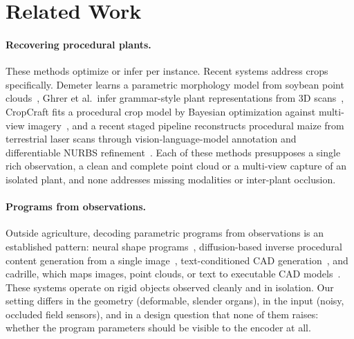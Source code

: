 \section{Related Work}
\label{sec:related}

\paragraph{Recovering procedural plants.}
 These methods optimize or
infer per instance. Recent systems address crops specifically. Demeter
learns a parametric morphology model from soybean point
clouds~\citep{demeter2025}, Ghrer et al.\ infer grammar-style plant
representations from 3D scans~\citep{ghrer2025paramplants}, CropCraft fits a
procedural crop model by Bayesian optimization against multi-view
imagery~\citep{cropcraft2026}, and a recent staged pipeline reconstructs
procedural maize from terrestrial laser scans through vision-language-model
annotation and differentiable NURBS
refinement~\citep{hadadi2026vlmmaize,nurbsdiff2022}. Each of these methods
presupposes a single rich observation, a clean and complete point cloud or a
multi-view capture of an isolated plant, and none addresses missing
modalities or inter-plant occlusion.

\paragraph{Programs from observations.}
Outside agriculture, decoding parametric programs from observations is an
established pattern: neural shape programs~\citep{shapeprograms2019},
diffusion-based inverse procedural content generation from a single
image~\citep{zhao2025dipcg}, text-conditioned CAD
generation~\citep{text2cad2024}, and cadrille, which maps images, point
clouds, or text to executable CAD models~\citep{kolodiazhnyi2025cadrille}.
These systems operate on rigid objects observed cleanly and in isolation.
Our setting differs in the geometry (deformable, slender organs), in the
input (noisy, occluded field sensors), and in a design question that none of
them raises: whether the program parameters should be visible to the encoder
at all.

